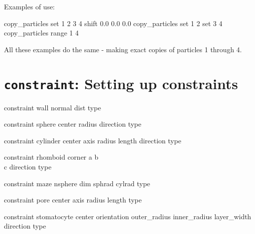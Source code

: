 Examples of use:\\
\begin{tclcode}
  copy_particles set {1 2 3 4} shift 0.0 0.0 0.0
  copy_particles set {1 2} set {3 4}
  copy_particles range 1 4
\end{tclcode}
All these examples do the same - making exact copies of particles 1 through 4.

\section{\texttt{constraint}: Setting up constraints}\label{sec:constraint}

\begin{essyntax}
  constraint wall normal    
  dist  type     
  
  constraint sphere center    
  radius  direction  type   
  
  constraint cylinder center    
  axis    
  radius  length  
  direction  
  type    
  
  constraint rhomboid corner    
  a    
  b    \\
  c    
  direction  
  type    
  
  constraint maze nsphere  
  dim  sphrad  cylrad 
  type  
  
  constraint pore center    
  axis    
  radius  length  
  type  

  constraint stomatocyte center    orientation   
  outer_radius  inner_radius  layer_width  direction  
  type   
  

\end{essyntax}
